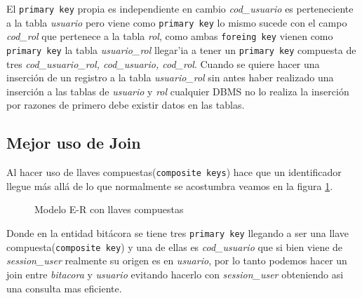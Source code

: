 El \texttt{primary key} propia es independiente en cambio \textit{cod\_usuario} es perteneciente a la tabla \textit{usuario} pero viene como \texttt{primary key} lo mismo sucede con el campo \textit{cod\_rol}  que pertenece a la tabla \textit{rol}, como ambas \texttt{foreing key} vienen como \texttt{primary key} la tabla \textit{usuario\_rol} llegar'ia a tener un \texttt{primary key} compuesta de tres \textit{cod\_usuario\_rol, cod\_usuario, cod\_rol}. Cuando se quiere hacer una inserci\'on de un registro a la tabla \textit{usuario\_rol} sin antes haber realizado una inserci\'on a las tablas de \textit{usuario} y \textit{rol} cualquier DBMS no lo realiza la inserci\'on por razones de primero debe existir datos en las tablas.
\subsection{Mejor uso de Join}
Al hacer uso de llaves compuestas(\texttt{composite keys}) hace que un identificador llegue m\'as all\'a de lo que normalmente se acostumbra veamos en la figura  \ref{fig:llavesCompuestas}.\\
\begin{figure}[H]
\centering
{}
\caption{Modelo E-R con llaves compuestas} \label{fig:llavesCompuestas}
\end{figure}
Donde en la entidad bit\'acora se tiene tres \texttt{primary key} llegando a ser una llave compuesta(\texttt{composite key}) y una de ellas es \textit{cod\_usuario} que si bien viene de \textit{session\_user} realmente su origen es en \textit{usuario}, por lo tanto podemos hacer un join entre \textit{bitacora} y \textit{usuario} evitando hacerlo con \textit{session\_user} obteniendo asi una consulta mas eficiente.
